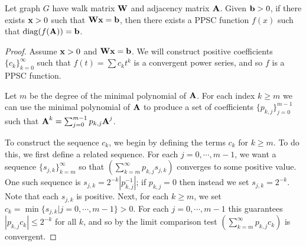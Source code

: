 \begin{theorem}\label{thm:pos-suff-condition}
    Let graph $G$ have walk matrix $\textbf{W}$ and adjacency matrix $\textbf{A}$.
    Given $\textbf{b} > 0$, if there exists $\textbf{x} > 0$ such that $\textbf{W}\textbf{x} = \textbf{b}$, then there exists a PPSC function $f(x)$ such that $\operatorname{diag}(f(\textbf{A})) = \textbf{b}$.
\end{theorem}
\begin{proof}
    Assume $\textbf{x} > 0$ and $\textbf{W}\textbf{x} =  \textbf{b}$.
    We will construct positive coefficients $\{c_k\}_{k=0}^{\infty}$ such that $f(t) = \sum c_k t^k$ is a convergent power series, and so $f$ is a PPSC function.

    Let $m$ be the degree of the minimal polynomial of $\textbf{A}$.
    For each index $k \geq m$ we can use the minimal polynomial of $\textbf{A}$ to produce a set of coefficients $\{ p_{k,j} \}_{j=0}^{m-1}$ such that
    $\textbf{A}^k = \sum_{j=0}^{m-1} p_{k,j} \textbf{A}^j$.

    To construct the sequence $c_k$, we begin by defining the terms $c_k$ for $k \geq m$.
    To do this, we first define a related sequence.
    For each $j=0, \cdots, m-1$, we want a sequence $\{s_{j,k}\}_{k=m}^{\infty}$ so that $\left(\sum_{k=m}^{\infty} p_{k,j} s_{j,k} \right)$ converges to some positive value.
    One such sequence is $s_{j,k} = 2^{-k} |p_{k,j}^{-1}|$;
    if $p_{k,j} = 0$ then instead we set $s_{j,k} = 2^{-k}$.
    Note that each $s_{j,k}$ is positive.
    Next, for each $k\geq m$, we set $c_k = \min\{  s_{j,k} | j=0,\cdots,m-1 \} > 0$.
    For each $j=0,\cdots, m-1$ this guarantees $|p_{k,j} c_k| \leq 2^{-k}$ for all $k$, and so by the limit comparison test
    $\left( \sum_{k=m}^{\infty} p_{k,j} c_k \right)$ is convergent.


\end{proof}
